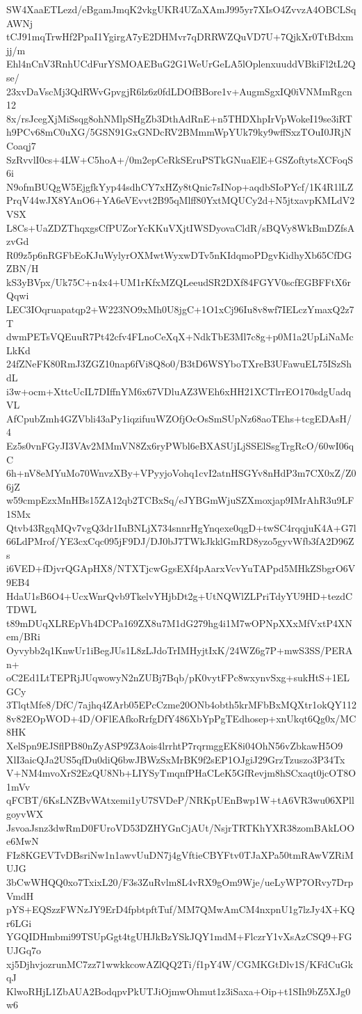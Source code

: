 SW4XaaETLezd/eBgamJmqK2vkgUKR4UZaXAmJ995yr7XIsO4ZvvzA4OBCLSqAWNj
tCJ91mqTrwHf2PpaI1YgirgA7yE2DHMvr7qDRRWZQuVD7U+7QjkXr0TtBdxmjj/m
Ehl4nCnV3RnhUCdFurYSMOAEBuG2G1WeUrGeLA5lOplenxuuddVBkiFl2tL2Qse/
23xvDaVscMj3QdRWvGpvgjR6lz6z0fdLDOfBBore1v+AugmSgxIQ0iVNMmRgcn12
8x/rsJcegXjMiSsqg8ohNMlpSHgZb3DthAdRnE+n5THDXhpIrVpWokeI19se3iRT
h9PCv68mC0uXG/5GSN91GxGNDcRV2BMmmWpYUk79ky9wffSxzTOuI0JRjNCoaqj7
SzRvvlI0cs+4LW+C5hoA+/0m2epCeRkSEruPSTkGNuaElE+GSZoftytsXCFoqS6i
N9ofmBUQgW5EjgfkYyp44sdhCY7xHZy8tQnic7sINop+aqdbSIoPYcf/1K4R1lLZ
PrqV44wJX8YAnO6+YA6eVEvvt2B95qMlff80YxtMQUCy2d+N5jtxavpKMLdV2VSX
L8Cs+UaZDZThqxgsCfPUZorYcKKuVXjtIWSDyovaCldR/sBQVy8WkBmDZfsAzvGd
R09z5p6nRGFbEoKJuWylyrOXMwtWyxwDTv5nKIdqmoPDgvKidhyXb65CfDGZBN/H
kS3yBVpx/Uk75C+n4x4+UM1rKfxMZQLeeudSR2DXf84FGYV0scfEGBFFtX6rQqwi
LEC3IOqruapatqp2+W223NO9xMh0U8jgC+1O1xCj96Iu8v8wf7IELczYmaxQ2z7T
dwmPETsVQEuuR7Pt42cfv4FLnoCeXqX+NdkTbE3Ml7c8g+p0M1a2UpLiNaMcLkKd
24fZNeFK80RmJ3ZGZ10nap6fVi8Q8o0/B3tD6WSYboTXreB3UFawuEL75ISzShdL
i3w+ocm+XttcUcIL7DIffnYM6x67VDluAZ3WEh6xHH21XCTlrrEO170sdgUadqVL
AfCpubZmh4GZVbli43aPy1iqzifuuWZOfjOcOsSmSUpNz68aoTEhs+tcgEDAsH/4
Ez5s0vnFGyJI3VAv2MMmVN8Zx6ryPWbl6eBXASUjLjSSElSsgTrgRcO/60wI06qC
6h+nV8eMYuMo70WnvzXBy+VPyyjoVohq1cvI2atnHSGYv8nHdP3m7CX0xZ/Z06jZ
w59cmpEzxMnHBs15ZA12qb2TCBxSq/eJYBGmWjuSZXmoxjap9IMrAhR3u9LF1SMx
Qtvb43RgqMQv7vgQ3dr1IuBNLjX734snnrHgYnqexe0qgD+twSC4rqqjuK4A+G7l
66LdPMrof/YE3cxCqc095jF9DJ/DJ0bJ7TWkJkklGmRD8yzo5gyvWfb3fA2D96Zs
i6VED+fDjvrQGApHX8/NTXTjcwGgsEXf4pAarxVcvYuTAPpd5MHkZSbgrO6V9EB4
HdaU1sB6O4+UcxWnrQvb9TkelvYHjbDt2g+UtNQWlZLPriTdyYU9HD+tezdCTDWL
t89mDUqXLREpVh4DCPa169ZX8u7M1dG279hg4i1M7wOPNpXXxMfVxtP4XNem/BRi
Oyvybb2q1KnwUr1iBegJUs1L8zLJdoTrIMHyjtIxK/24WZ6g7P+mwS3SS/PERAn+
oC2Ed1LtTEPRjJUqwowyN2nZUBj7Bqb/pK0vytFPc8wxynvSxg+sukHtS+1ELGCy
3TlqtMfe8/DfC/7ajhq4ZArb05EPcCzme20ONb4obth5krMFbBxMQXtr1okQY112
8v82EOpWOD+4D/OFlEAfkoRrfgDfY486XbYpPgTEdhosep+xnUkqt6Qg0x/MC8HK
XelSpn9EJSflPB80nZyASP9Z3Aois4lrrhtP7rqrmggEK8i04OhN56vZbkawH5O9
XlI3aicQJa2US5qfDu0diQ6bwJBWzSxMrBK9f2sEP1OJgiJ29GrzTzuszo3P34Tx
V+NM4mvoXrS2EzQU8Nb+LIYSyTmqnfPHaCLeK5GfRevjm8hSCxaqt0jcOT8O1mVv
qFCBT/6KsLNZBvWAtxemi1yU7SVDeP/NRKpUEnBwp1W+tA6VR3wu06XPllgoyvWX
JsvoaJsnz3dwRmD0FUroVD53DZHYGnCjAUt/NsjrTRTKhYXR38zomBAkLOOe6MwN
FIz8KGEVTvDBsriNw1n1awvUuDN7j4gVftieCBYFtv0TJaXPa50tmRAwVZRiMUJG
3bCwWHQQ0xo7TxixL20/F3s3ZuRvlm8L4vRX9gOm9Wje/ueLyWP7ORvy7DrpVmdH
pYS+EQSzzFWNzJY9ErD4fpbtpftTuf/MM7QMwAmCM4nxpnU1g7lzJy4X+KQr6LGi
YGQIDHmbmi99TSUpGgt4tgUHJkBzYSkJQY1mdM+FlczrY1vXsAzCSQ9+FGUJGq7o
xj5DjhvjozrunMC7zz71wwkkcowAZlQQ2Ti/f1pY4W/CGMKGtDlv1S/KFdCuGkqJ
KlwoRHjL1ZbAUA2BodqpvPkUTJiOjmwOhmut1z3iSaxa+Oip+t1SIh9bZ5XJg0w6

